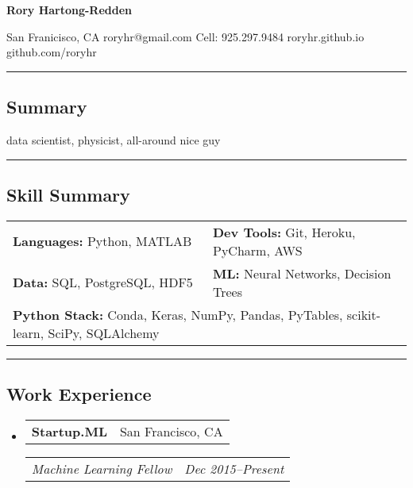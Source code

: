 \documentclass[10pt,letterpaper]{article}
\makeatletter
\newenvironment{indentsection}[1]%
{\begin{list}{}%
	{\setlength{\leftmargin}{#1}}%
	\item[]%
}
{\end{list}}
\newcommand{\headerrow}[2]
{\begin{tabular*}{\linewidth}{l@{\extracolsep{\fill}}r}
	#1 &
	#2 \\
\end{tabular*}}
\makeatother
\begin{document}
{\raggedright \LARGE \bf Rory Hartong-Redden\\}

{\raggedleft 
San Franicisco, CA \textbar\/ 
roryhr@gmail.com \textbar\/ 
Cell: 925.297.9484 \textbar\/ 
roryhr.github.io \textbar\/   
github.com/roryhr\\}
\hrule

\subsection*{Summary}

\vspace{-0.4em}

\begin{centering}  
data scientist, physicist, all-around nice guy\\
\end{centering}

\vspace{0.4em}

\hrule
\subsection*{Skill Summary}
\begin{indentsection}{\parindent}
\begin{tabular}{p{0.5\linewidth}   p{0.5\linewidth} } 
	\textbf{Languages:}  Python, MATLAB 	
	& \textbf{Dev Tools:}  Git, Heroku, PyCharm, AWS \\  

	\textbf{Data:} SQL, PostgreSQL, HDF5
	& \textbf{ML:} Neural Networks, Decision Trees  \\
	
	\multicolumn{2}{l}{\textbf{Python Stack:} Conda, Keras, NumPy, Pandas, PyTables, scikit-learn, SciPy, SQLAlchemy} \\
\end{tabular}
\end{indentsection}


\hrule
\subsection*{Work Experience}
\begin{itemize}
	\parskip=-0.1em
	\item
	\headerrow
		{\textbf{Startup.ML}}
		{San Francisco, CA}
	\headerrow
		{\emph{Machine Learning Fellow}}
		{\emph{Dec 2015--Present}}
\end{itemize}
\end{document}
